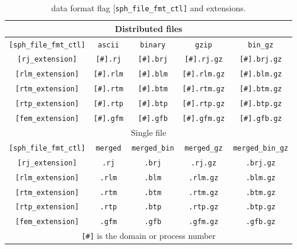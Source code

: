 \begin{table}[htp]
\caption{data format flag {[\tt sph\_file\_fmt\_ctl]} and extensions.}
\begin{center} 
\begin{tabular}{|c||c|c|c|c|}
\hline
  \multicolumn{5}{|c|}{Distributed files} \\ \hline
  \verb|[sph_file_fmt_ctl]| &  \verb|ascii| & \verb|binary| & \verb|gzip| & \verb|bin_gz| \\ \hline
\verb|[rj_extension]|  & \verb|[#].rj|  & \verb|[#].brj| & \verb|[#].rj.gz|  & \verb|[#].brj.gz| \\
\verb|[rlm_extension]| & \verb|[#].rlm| & \verb|[#].blm| & \verb|[#].rlm.gz| & \verb|[#].blm.gz| \\
\verb|[rtm_extension]| & \verb|[#].rtm| & \verb|[#].btm| & \verb|[#].rtm.gz| & \verb|[#].btm.gz| \\
\verb|[rtp_extension]| & \verb|[#].rtp| & \verb|[#].btp| & \verb|[#].rtp.gz| & \verb|[#].btp.gz| \\ \hline
\verb|[fem_extension]| & \verb|[#].gfm| & \verb|[#].gfb| & \verb|[#].gfm.gz| & \verb|[#].gfb.gz| \\ \hline \hline
  \multicolumn{5}{|c|}{Single file}  \\ \hline
  \verb|[sph_file_fmt_ctl]| & \verb|merged| & \verb|merged_bin| & \verb|merged_gz| & \verb|merged_bin_gz| \\ \hline
\verb|[rj_extension]|   & \verb|.rj|  & \verb|.brj| & \verb|.rj.gz|  & \verb|.brj.gz| \\
\verb|[rlm_extension]| & \verb|.rlm| & \verb|.blm| & \verb|.rlm.gz| & \verb|.blm.gz| \\
\verb|[rtm_extension]| & \verb|.rtm| & \verb|.btm| & \verb|.rtm.gz| & \verb|.btm.gz| \\
\verb|[rtp_extension]| & \verb|.rtp| & \verb|.btp| & \verb|.rtp.gz| & \verb|.btp.gz| \\ \hline
\verb|[fem_extension]| & \verb|.gfm| & \verb|.gfb| & \verb|.gfm.gz| & \verb|.gfb.gz| \\ \hline \hline
  \multicolumn{5}{c}{{\tt [\#]} is the domain or process number} \\
\end{tabular}
\end{center}
\label{table:mesh_format}
\end{table}
%
